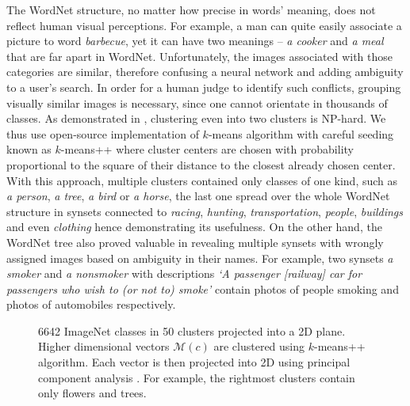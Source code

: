 The WordNet structure, no matter how precise in words' meaning, does not reflect human visual perceptions. For example, a man can quite easily associate a picture to word \textit{barbecue}, yet it can have two meanings -- \textit{a cooker} and \textit{a meal} that are far apart in WordNet. Unfortunately, the images associated with those categories are similar, therefore confusing a neural network and adding ambiguity to a user's search. In order for a human judge to identify such conflicts, grouping visually similar images is necessary, since one cannot orientate in thousands of classes. As demonstrated in \cite{dasgupta2008hardnessKmeans}, clustering even into two clusters is NP-hard. We thus use open-source implementation \cite{scikit-learn} of $k$-means algorithm with careful seeding known as $k$-means++ \cite{kmeans} where cluster centers are chosen with probability proportional to the square of their distance to the closest already chosen center. With this approach, multiple clusters contained only classes of one kind, such as \textit{a person}, \textit{a tree}, \textit{a bird} or \textit{a horse}, the last one spread over the whole WordNet structure in synsets connected to \textit{racing}, \textit{hunting}, \textit{transportation}, \textit{people}, \textit{buildings} and even \textit{clothing} hence demonstrating its usefulness. On the other hand, the WordNet tree also proved valuable in revealing multiple synsets with wrongly assigned images based on ambiguity in their names. For example, two synsets \textit{a smoker} and \textit{a nonsmoker} with descriptions \textit{`A passenger [railway] car for passengers who wish to (or not to) smoke'} contain photos of people smoking and photos of automobiles respectively.


\begin{figure}
	\centering
	\scalebox{0.8}{}
	\caption[Projection of ImageNet classes into 2D]{6642 ImageNet classes in 50 clusters projected into a 2D plane. Higher dimensional vectors $\mathcal{M}(c)$ are clustered using $k$-means++ \cite{kmeans} algorithm. Each vector is then projected into 2D using principal component analysis \cite{pca}. For example, the rightmost clusters contain only flowers and trees.}
	\label{fig:dataset_clusters}
\end{figure}

